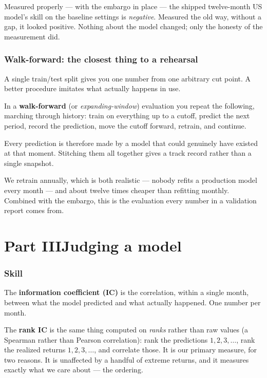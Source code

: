 \documentclass[11pt]{article}
\begin{document}
\begin{keybox}
Measured properly --- with the embargo in place --- the shipped twelve-month US model's
skill on the baseline settings is \emph{negative}. Measured the old way, without a gap,
it looked positive. Nothing about the model changed; only the honesty of the
measurement did.
\end{keybox}

\section{Walk-forward: the closest thing to a rehearsal}

A single train/test split gives you one number from one arbitrary cut point. A better
procedure imitates what actually happens in use.

\begin{specbox}
In a \textbf{walk-forward} (or \emph{expanding-window}) evaluation you repeat the
following, marching through history: train on everything up to a cutoff, predict the
next period, record the prediction, move the cutoff forward, retrain, and continue.

Every prediction is therefore made by a model that could genuinely have existed at
that moment. Stitching them all together gives a track record rather than a single
snapshot.
\end{specbox}

We retrain annually, which is both realistic --- nobody refits a production model every
month --- and about twelve times cheaper than refitting monthly. Combined with the
embargo, this is the evaluation every number in a validation report comes from.

\part*{Part III\quad Judging a model}

\section{Skill}

\begin{specbox}
The \textbf{information coefficient (IC)} is the correlation, within a single month,
between what the model predicted and what actually happened. One number per month.

The \textbf{rank IC} is the same thing computed on \emph{ranks} rather than raw values
(a Spearman rather than Pearson correlation): rank the predictions $1,2,3,\dots$, rank
the realized returns $1,2,3,\dots$, and correlate those. It is our primary measure,
for two reasons. It is unaffected by a handful of extreme returns, and it measures
exactly what we care about --- the ordering.
\end{specbox}
\end{document}
